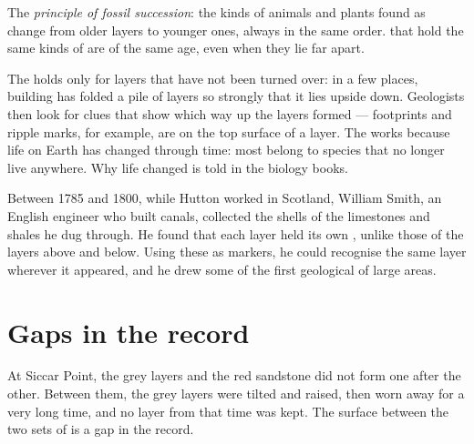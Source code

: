 \begin{definition}\label{def:g7:geological-time:fossil-succession}
The \emph{principle of fossil succession}: the kinds of animals and plants found as  change
from older layers to younger ones, always in the same order.  that
hold the same kinds of  are of the same age, even when they lie
far apart.
\end{definition}


The  holds only for layers that have not been
turned over: in a few places,  building has folded a pile of
layers so strongly that it lies upside down. Geologists then look for
clues that show which way up the layers formed --- footprints and ripple
marks, for example, are on the top surface of a layer. The  works because life on Earth has changed through time:
most  belong to species that no longer live anywhere. Why life
changed is told in the biology books.

\begin{history}
Between 1785 and 1800, while Hutton worked in Scotland, William Smith, an
English engineer who built canals, collected the  shells of the
limestones and shales he dug through. He found that each layer held its
own , unlike those of the layers above and below. Using these
 as markers, he could recognise the same layer wherever it
appeared, and he drew some of the first geological  of large areas.
\end{history}

\section{Gaps in the record}

At Siccar Point, the grey layers and the red sandstone did not form one
after the other. Between them, the grey layers were tilted and raised,
then worn away for a very long time, and no layer from that time was
kept. The surface between the two sets of  is a gap in the record.

